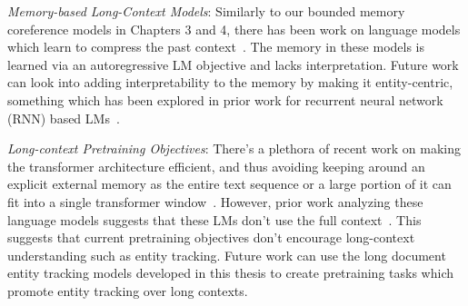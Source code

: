 \documentclass[12pt]{thesis-umich}[thesis]
\begin{document}
\emph{Memory-based Long-Context Models}: Similarly to our bounded memory coreference models in Chapters 3 and 4, there has been work on language models which learn to compress the past context~\cite{Rae2020Compressive, Sukhbaatar2021NotAM}. The memory in these models is learned via an  autoregressive LM objective and lacks interpretation. Future work can look into adding interpretability to the memory by making it entity-centric, something which has been explored in prior work for recurrent neural network (RNN) based LMs~\cite{ji-etal-2017-dynamic, clark-etal-2018-neural}. 

\emph{Long-context Pretraining Objectives}:
There's a plethora of recent work on making the transformer architecture efficient, and thus avoiding keeping around an explicit external memory as the entire text sequence or a large portion of it can fit into a single transformer window~\citep[\emph{inter alia}]{roy-etal-2021-efficient, jaegle2022perceiver, Rae2020Compressive, Hutchins2022Block}.  
However, prior work analyzing these language models suggests that these LMs don't use the full context~\cite{sun-etal-2021-long}. This suggests that current pretraining objectives don't encourage long-context understanding such as entity tracking. Future work can use the long document entity tracking models developed in this thesis to create pretraining tasks which promote entity tracking over long contexts. 




  
\newpage




\end{document}
